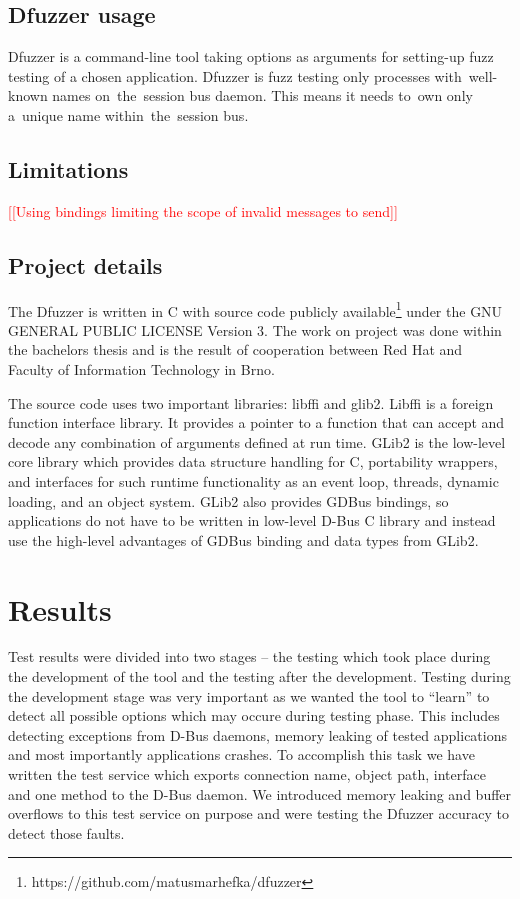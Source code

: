 \documentclass[conference]{IEEEtran}
\newcommand{\addtodo}[1]{\textcolor{red}{[[#1]]}}
\newcommand{\dummytext}{\textcolor{light-gray}{\Blindtext}}
\begin{document}
\subsection{Dfuzzer usage}
Dfuzzer is a command-line tool taking options as arguments for setting-up fuzz
testing of a chosen application. Dfuzzer is fuzz testing only processes
with~well-known names on~the~session bus daemon. This means it needs to~own
only a~unique name within~the~session bus.

\dummytext
\subsection{Limitations}
\addtodo{Using bindings limiting the scope of invalid messages to send}

\subsection{Project details}
The Dfuzzer is written in C with source code publicly
available\footnote{https://github.com/matusmarhefka/dfuzzer} under the GNU GENERAL
PUBLIC LICENSE Version 3. The work on project was done within the bachelors thesis
and is the result of cooperation between Red Hat and Faculty of Information
Technology in Brno.

The source code uses two important libraries: libffi and glib2.
Libffi is a foreign function interface library. It provides a pointer to a function
that can accept and decode any combination of arguments defined at run time.
GLib2 is the low-level core library which provides data structure handling for C,
portability wrappers, and interfaces for such runtime functionality as an event
loop, threads, dynamic loading, and an object system. GLib2 also provides GDBus
bindings, so applications do not have to be written in low-level D-Bus C library
and instead use the high-level advantages of GDBus binding and data types from GLib2.



\section{Results}
Test results were divided into two stages -- the testing which took place during
the development of the tool and the testing after the development. Testing during
the development stage was very important as we wanted the tool to ``learn''
to detect all possible options which may occure during testing phase. This
includes detecting exceptions from D-Bus daemons, memory leaking of tested
applications and most importantly applications crashes. To accomplish this task
we have written the test service which exports connection name, object path,
interface and one method to the D-Bus daemon. We introduced memory leaking
and buffer overflows to this test service on purpose and were testing
the Dfuzzer accuracy to detect those faults.
\end{document}

